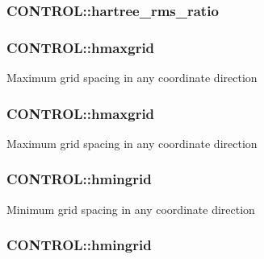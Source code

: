 \hypertarget{struct_c_o_n_t_r_o_l_a7e295bc2ee5135ee4cb2c03507646f0f}{
\subsubsection[{hartree\-\_\-rms\-\_\-ratio}]{ C\-O\-N\-T\-R\-O\-L\-::hartree\-\_\-rms\-\_\-ratio}}\label{struct_c_o_n_t_r_o_l_a7e295bc2ee5135ee4cb2c03507646f0f}
\hypertarget{struct_c_o_n_t_r_o_l_a5ecd08ae400c38e0b65c368e9148a444}{
\subsubsection[{hmaxgrid}]{ C\-O\-N\-T\-R\-O\-L\-::hmaxgrid}}\label{struct_c_o_n_t_r_o_l_a5ecd08ae400c38e0b65c368e9148a444}
Maximum grid spacing in any coordinate direction \hypertarget{struct_c_o_n_t_r_o_l_ab531899bebac4c84ea6de5621249761d}{
\subsubsection[{hmaxgrid}]{ C\-O\-N\-T\-R\-O\-L\-::hmaxgrid}}\label{struct_c_o_n_t_r_o_l_ab531899bebac4c84ea6de5621249761d}
Maximum grid spacing in any coordinate direction \hypertarget{struct_c_o_n_t_r_o_l_a090c9f414369c97b1f76af36a2a1535f}{
\subsubsection[{hmingrid}]{ C\-O\-N\-T\-R\-O\-L\-::hmingrid}}\label{struct_c_o_n_t_r_o_l_a090c9f414369c97b1f76af36a2a1535f}
Minimum grid spacing in any coordinate direction \hypertarget{struct_c_o_n_t_r_o_l_ac591cc8bc4288520a238a977af8279b4}{
\subsubsection[{hmingrid}]{ C\-O\-N\-T\-R\-O\-L\-::hmingrid}}\label{struct_c_o_n_t_r_o_l_ac591cc8bc4288520a238a977af8279b4}
